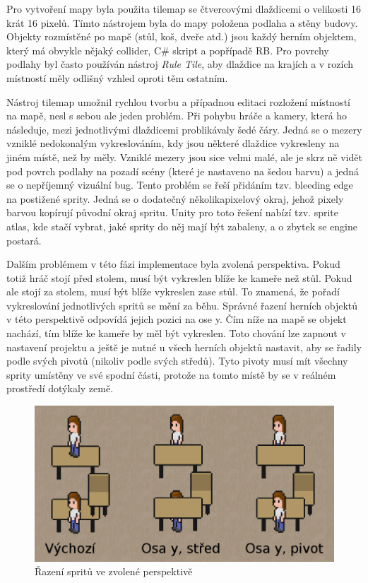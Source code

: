 \documentclass[FM,Proj]{tulthesis}
\begin{document}
	Pro vytvoření mapy byla použita tilemap se čtvercovými dlaždicemi o velikosti 16 krát 16 pixelů. Tímto nástrojem byla do mapy položena podlaha a stěny budovy. Objekty rozmístěné po mapě (stůl, koš, dveře atd.) jsou každý herním objektem, který má obvykle nějaký collider, C\# skript a popřípadě RB. Pro povrchy podlahy byl často používán nástroj \textit{Rule Tile}, aby dlaždice na krajích a v rozích místností měly odlišný vzhled oproti těm ostatním.
	
	Nástroj tilemap umožnil rychlou tvorbu a případnou editaci rozložení místností na mapě, nesl s sebou ale jeden problém. Při pohybu hráče a kamery, která ho následuje, mezi jednotlivými dlaždicemi problikávaly šedé čáry. Jedná se o mezery vzniklé nedokonalým vykreslováním, kdy jsou některé dlaždice vykresleny na jiném místě, než by měly. Vzniklé mezery jsou sice velmi malé, ale je skrz ně vidět pod povrch podlahy na pozadí scény (které je nastaveno na šedou barvu) a jedná se o nepříjemný vizuální bug. Tento problém se řeší přidáním tzv. bleeding edge na postižené sprity. Jedná se o dodatečný několikapixelový okraj, jehož pixely barvou kopírují původní okraj spritu. Unity pro toto řešení nabízí tzv. sprite atlas, kde stačí vybrat, jaké sprity do něj mají být zabaleny, a o zbytek se engine postará.
	
	Dalším problémem v této fázi implementace byla zvolená perspektiva. Pokud totiž hráč stojí před stolem, musí být vykreslen blíže ke kameře než stůl. Pokud ale stojí za stolem, musí být blíže vykreslen zase stůl. To znamená, že pořadí vykreslování jednotlivých spritů se mění za běhu. Správné řazení herních objektů v této perspektivě odpovídá jejich pozici na ose y. Čím níže na mapě se objekt nachází, tím blíže ke kameře by měl být vykreslen. Toto chování lze zapnout v nastavení projektu a ještě je nutné u všech herních objektů nastavit, aby se řadily podle svých pivotů (nikoliv podle svých středů). Tyto pivoty musí mít všechny sprity umístěny ve své spodní části, protože na tomto místě by se v reálném prostředí dotýkaly země.
	
	\begin{figure}[ht]
		\centering
		\includegraphics[width=\textwidth]{img/SpriteSort}
		\caption{Řazení spritů ve zvolené perspektivě}		
	\end{figure}
	
\end{document}

